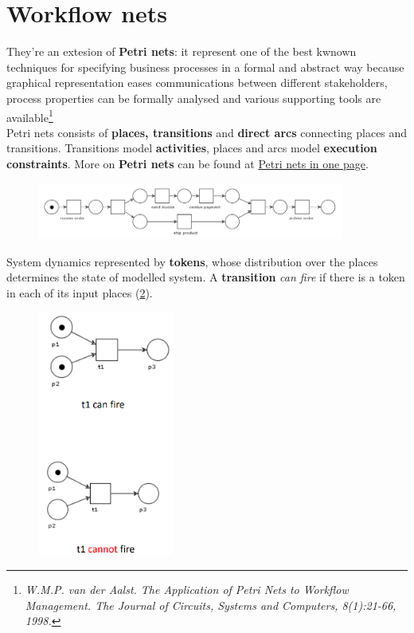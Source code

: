\documentclass[10pt,a4paper]{report}
\begin{document}
\section{Workflow nets}
They're an extesion of \textbf{Petri nets}: it represent one of the best kwnown techniques  for specifying business processes in a formal and abstract way because graphical representation eases communications between different stakeholders, process properties can be formally analysed and various supporting tools are available\footnote{\textit{W.M.P. van der Aalst. The Application of Petri Nets to Workflow Management. The Journal of Circuits, Systems and Computers, 8(1):21-66, 1998.}}\\
Petri nets consists of \textbf{places, transitions} and \textbf{direct arcs} connecting places and transitions. Transitions model \textbf{activities}, places and arcs model \textbf{execution constraints}. More on \textbf{Petri nets} can be found at \href{http://pages.di.unipi.it/brogi/note.pdf}{Petri nets in one page}.
\begin{figure}[h]
	\centering
	\includegraphics[width=0.9\textwidth]{image78}
	\caption{}
	\label{image78}
\end{figure}
System dynamics represented by \textbf{tokens}, whose distribution over the places determines the state of modelled system. A \textbf{transition} \textit{can fire} if there is a token in each of its input places (\ref{image79}). 
\begin{figure}[h]
	\centering
	\includegraphics[width=0.4\textwidth]{image79}
	\caption{}
	\label{image79}
\end{figure}
\end{document}
